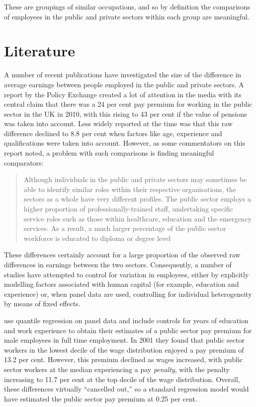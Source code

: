 \documentclass[a4paper,11pt,titlepage]{article}
\begin{document}
\begin{db}
These are groupings of similar occupations, and so by definition the comparisons of employees in the public and private sectors within each group are meaningful.
\end{db}

\begin{db}
\end{db}

\section{Literature}
A number of recent publications have investigated the size of the difference in average earnings between people employed in the public and private sectors.  A report by the Policy Exchange \citep{Holmes2011} created a lot of attention in the media with its central claim that there was a 24 per cent pay premium for working in the public sector in the UK in 2010, with this rising to 43 per cent if the value of pensions was taken into account.  Less widely reported at the time was that this raw difference declined to 8.8 per cent when factors like age, experience and qualifications were taken into account.  However, as some commentators on this report noted, a problem with such comparisons is finding meaningful comparators:
\begin{quote}
    Although individuals in the public and private sectors may sometimes be able to identify similar roles within their respective organisations, the sectors as a whole have very different profiles. The public sector employs a higher proportion of professionally-trained staff, undertaking specific service roles such as those within healthcare, education and the emergency services. As a result, a much larger percentage of the public sector workforce is educated to diploma or degree level \citep[p.~13]{IDS2011}
\end{quote}
These differences certainly account for a large proportion of the observed raw differences in earnings between the two sectors.  Consequently, a number of studies have attempted to control for variation in employees, either by explicitly modelling factors associated with human capital (for example, education and experience) or, when panel data are used, controlling for individual heterogeneity by means of fixed effects.

\citet{Yu2005} use quantile regression on panel data and include controls for years of education and work experience to obtain their estimates of a public sector pay premium for male employees in full time employment.  In 2001 they found that public sector workers in the lowest decile of the wage distribution enjoyed a pay premium of 13.2 per cent.  However, this premium declined as wages increased, with public sector workers at the median experiencing a pay \emph{penalty}, with the penalty increasing to 11.7 per cent at the top decile of the wage distribution.  Overall, these differences virtually ``cancelled out,'' so a standard regression model would have estimated the public sector pay premium at 0.25 per cent.
\end{document}

